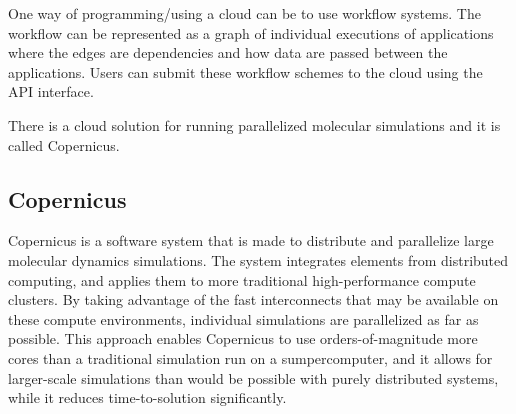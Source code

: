 


One way of programming/using a cloud can be to use workflow
systems. The workflow can be represented as a graph of individual
executions of applications where the edges are dependencies and how
data are passed between the applications. Users can submit these
workflow schemes to the cloud using the API interface.







There is a cloud solution for running parallelized molecular
simulations and it is called Copernicus.


\subsection{Copernicus}
Copernicus is a software system that is made to distribute and
parallelize large molecular dynamics simulations. The system
integrates elements from distributed computing, and applies them to
more traditional high-performance compute clusters. By taking
advantage of the fast interconnects that may be available on these
compute environments, individual simulations are parallelized as far
as possible. This approach enables Copernicus to use
orders-of-magnitude more cores than a traditional simulation run on a
sumpercomputer, and it allows for larger-scale simulations than would
be possible with purely distributed systems, while it reduces
time-to-solution significantly.

